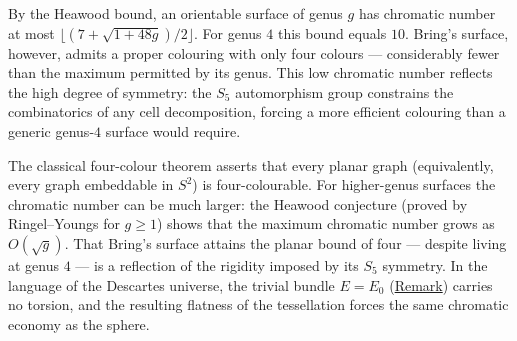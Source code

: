 \begin{remark}
  \label{rem:four-colourability}
By the Heawood bound, an orientable surface of genus $g$ has chromatic number
at most $\lfloor(7+\sqrt{1+48g})/2\rfloor$.  For genus $4$ this bound
equals $10$.  Bring's surface, however, admits a proper colouring with only
four colours --- considerably fewer than the maximum permitted by its genus.
This low chromatic number reflects the high degree of symmetry: the $S_5$
automorphism group constrains the combinatorics of any cell decomposition,
forcing a more efficient colouring than a generic genus-$4$ surface would
require.
\end{remark}

\begin{remark}
  \label{rem:four-colour-theorem}
The classical four-colour theorem asserts that every planar graph (equivalently,
every graph embeddable in $S^2$) is four-colourable.  For higher-genus
surfaces the chromatic number can be much larger: the Heawood conjecture
(proved by Ringel--Youngs for $g\geq 1$) shows that the maximum chromatic
number grows as $O(\sqrt{g})$.  That Bring's surface attains the planar
bound of four --- despite living at genus $4$ --- is a reflection of the
rigidity imposed by its $S_5$ symmetry.  In the language of the Descartes
universe, the trivial bundle $E=E_0$
(\hyperref[rem:radial-projection]{Remark}) carries no torsion, and the resulting
flatness of the tessellation forces the same chromatic economy as the
sphere.
\end{remark}


